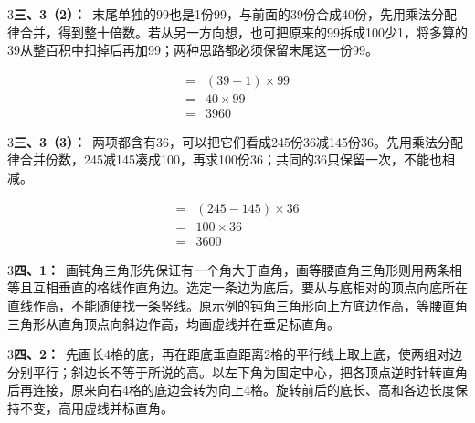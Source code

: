 \documentclass[multi=snippet,border={5bp 20bp 5bp 5bp}]{standalone}
\newenvironment{snippet}[3]{\begin{minipage}{#1bp}\color{answerred}\fontsize{#2}{#3}\selectfont\raggedright}{\end{minipage}}
\begin{document}
\begin{snippet}{505}{11.5}{14}\begin{multicols}{3}\raggedcolumns \textbf{三、3（2）：}\ 末尾单独的99也是1份99，与前面的39份合成40份，先用乘法分配律合并，得到整十倍数。若从另一方向想，也可把原来的99拆成100少1，将多算的39从整百积中扣掉后再加99；两种思路都必须保留末尾这一份99。\end{multicols}\end{snippet}
\begin{snippet}{125.56700000000001}{10.5}{12.8}\SourceSans\setlength{\mathindent}{2bp}\[\begin{aligned}={}&(39+1)\times99\\={}&40\times99\\={}&3960\end{aligned}\]\end{snippet}
\begin{snippet}{505}{11.5}{14}\begin{multicols}{3}\raggedcolumns \textbf{三、3（3）：}\ 两项都含有36，可以把它们看成245份36减145份36。先用乘法分配律合并份数，245减145凑成100，再求100份36；共同的36只保留一次，不能也相减。\end{multicols}\end{snippet}
\begin{snippet}{192.733}{10.5}{12.8}\SourceSans\setlength{\mathindent}{2bp}\[\begin{aligned}={}&(245-145)\times36\\={}&100\times36\\={}&3600\end{aligned}\]\end{snippet}
\begin{snippet}{505}{11.5}{14}\begin{multicols}{3}\raggedcolumns \textbf{四、1：}\ 画钝角三角形先保证有一个角大于直角，画等腰直角三角形则用两条相等且互相垂直的格线作直角边。选定一条边为底后，要从与底相对的顶点向底所在直线作高，不能随便找一条竖线。原示例的钝角三角形向上方底边作高，等腰直角三角形从直角顶点向斜边作高，均画虚线并在垂足标直角。\end{multicols}\end{snippet}
\begin{snippet}{505}{11.5}{14}\begin{multicols}{3}\raggedcolumns \textbf{四、2：}\ 先画长4格的底，再在距底垂直距离2格的平行线上取上底，使两组对边分别平行；斜边长不等于所说的高。以左下角为固定中心，把各顶点逆时针转直角后再连接，原来向右4格的底边会转为向上4格。旋转前后的底长、高和各边长度保持不变，高用虚线并标直角。\end{multicols}\end{snippet}
\end{document}
